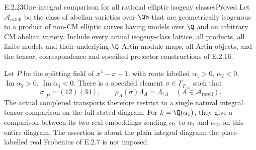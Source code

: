 \begin{result}{E.2.23}{One integral comparison for all rational elliptic isogeny classes}{Proved}
Let \(\mathcal A_{\mathrm{ratell}}\) be the class of abelian
varieties over \(\Qb\) that are geometrically isogenous to a
product of non-CM elliptic curves having models over \(\Q\)
and an arbitrary CM abelian variety. Include every actual
isogeny-class lattice, all products, all finite models and their
underlying-\(\Q\) Artin module maps, all Artin objects, and
the tensor, correspondence and specified projector constructions
of E.2.16.

Let \(P\) be the splitting field of \(x^4-x-1\), with roots
labelled \(\alpha_1>0\), \(\alpha_2<0\),
\(\operatorname{Im}\alpha_3>0\),
\(\operatorname{Im}\alpha_4<0\). There is a specified element
\(\sigma\in\Gamma_{F_{\mathrm{cm}}}\) such that
\[
 \sigma|_P=(12)(34),\qquad
 \rho_A(\sigma)\Lambda_A=\Lambda_{{}^{\sigma}A}
       \quad(A\in\mathcal A_{\mathrm{ratell}}).
 \tag{E.2.23a}
\]
The actual completed transports therefore restrict to a single
natural integral tensor comparison on the full stated diagram.
For \(k=\Q(\alpha_1)\), they give a comparison between its
two real embeddings sending \(\alpha_1\) to
\(\alpha_1\) and \(\alpha_2\), on this entire diagram.
The assertion is about the plain integral diagram; the
place-labelled real Frobenius of E.2.7 is not imposed.
\end{result}
